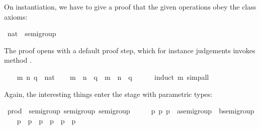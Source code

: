 \begin{isabellebody}
\begin{isamarkuptext}
On instantiation, we have to give a proof that the given operations
obey the class axioms:%
\end{isamarkuptext}%
\isamarkuptrue%
\isamarkupfalse%
\ nat\ {\isacharcolon}{\isacharcolon}\ semigroup\isanewline
{}\isanewline
\isanewline
{}\isamarkupfalse%
%
\isadelimproof
\ %
\endisadelimproof
%
\isatagproof
{}\isamarkupfalse%
%
\begin{isamarkuptxt}%
\noindent The proof opens with a default proof step, which for
instance judgements invokes method \hyperlink{method.intro-classes}{\mbox{}}.%
\end{isamarkuptxt}%
\isamarkuptrue%
\ \ \isamarkupfalse%
\ m\ n\ q\ {\isacharcolon}{\isacharcolon}\ nat\isanewline
\ \ \isamarkupfalse%
\ {\isachardoublequoteopen}{\isacharparenleft}m\ {\isasymoplus}\ n{\isacharparenright}\ {\isasymoplus}\ q\ {\isacharequal}\ m\ {\isasymoplus}\ {\isacharparenleft}n\ {\isasymoplus}\ q{\isacharparenright}{\isachardoublequoteclose}\isanewline
\ \ \ \ \isamarkupfalse%
\ {\isacharparenleft}induct\ m{\isacharparenright}\ simp{\isacharunderscore}all\isanewline
{}\isamarkupfalse%
%
\endisatagproof
{\isafoldproof}%
%
\isadelimproof
%
\endisadelimproof
\isanewline
\isanewline
{}\isamarkupfalse%
%
\begin{isamarkuptext}%
\noindent Again, the interesting things enter the stage with
parametric types:%
\end{isamarkuptext}%
\isamarkuptrue%
\isamarkupfalse%
\ prod\ {\isacharcolon}{\isacharcolon}\ {\isacharparenleft}semigroup{\isacharcomma}\ semigroup{\isacharparenright}\ semigroup\isanewline
{}\isanewline
\isanewline
{}\isamarkupfalse%
%
\isadelimproof
\ %
\endisadelimproof
%
\isatagproof
{}\isamarkupfalse%
\isanewline
\ \ \isamarkupfalse%
\ p\ p\ p\ {\isacharcolon}{\isacharcolon}\ {\isachardoublequoteopen}{\isacharprime}a{\isasymColon}semigroup\ {\isasymtimes}\ {\isacharprime}b{\isasymColon}semigroup{\isachardoublequoteclose}\isanewline
\ \ \isamarkupfalse%
\ {\isachardoublequoteopen}p\ {\isasymoplus}\ p\ {\isasymoplus}\ p\ {\isacharequal}\ p\ {\isasymoplus}\ {\isacharparenleft}p\ {\isasymoplus}\ p\isanewline

\end{isabellebody}
